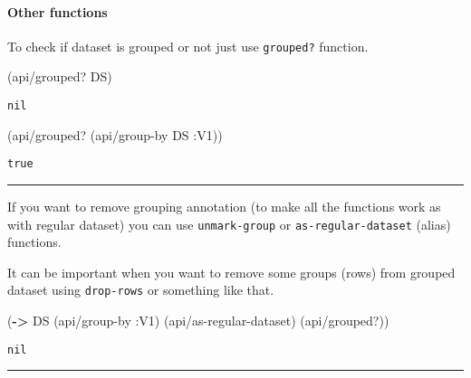 \documentclass[]{article}
\newenvironment{Shaded}{\begin{snugshade}}{\end{snugshade}}
\newcommand{\AttributeTok}[1]{\textcolor[rgb]{0.77,0.63,0.00}{#1}}
\newcommand{\KeywordTok}[1]{\textcolor[rgb]{0.13,0.29,0.53}{\textbf{#1}}}
\newcommand{\NormalTok}[1]{#1}
\let\oldparagraph\paragraph
\renewcommand{\paragraph}[1]{\oldparagraph{#1}\mbox{}}
\begin{document}
\hypertarget{other-functions}{%
\paragraph{Other functions}\label{other-functions}}

To check if dataset is grouped or not just use \texttt{grouped?}
function.

\begin{Shaded}
\begin{Highlighting}[]
\NormalTok{(api/grouped? DS)}
\end{Highlighting}
\end{Shaded}

\begin{verbatim}
nil
\end{verbatim}

\begin{Shaded}
\begin{Highlighting}[]
\NormalTok{(api/grouped? (api/group-by DS }\AttributeTok{:V1}\NormalTok{))}
\end{Highlighting}
\end{Shaded}

\begin{verbatim}
true
\end{verbatim}

\begin{center}\rule{0.5\linewidth}{0.5pt}\end{center}

If you want to remove grouping annotation (to make all the functions
work as with regular dataset) you can use \texttt{unmark-group} or
\texttt{as-regular-dataset} (alias) functions.

It can be important when you want to remove some groups (rows) from
grouped dataset using \texttt{drop-rows} or something like that.

\begin{Shaded}
\begin{Highlighting}[]
\NormalTok{(}\KeywordTok{->}\NormalTok{ DS}
\NormalTok{    (api/group-by }\AttributeTok{:V1}\NormalTok{)}
\NormalTok{    (api/as-regular-dataset)}
\NormalTok{    (api/grouped?))}
\end{Highlighting}
\end{Shaded}

\begin{verbatim}
nil
\end{verbatim}

\begin{center}\rule{0.5\linewidth}{0.5pt}\end{center}
\end{document}
